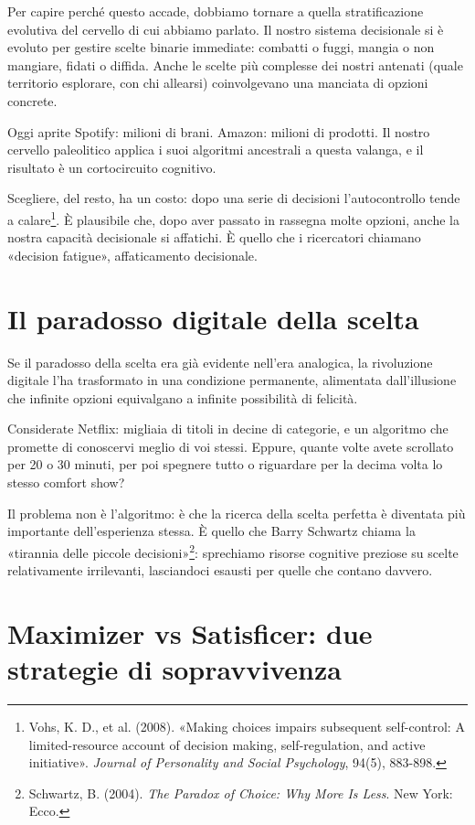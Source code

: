 Per capire perché questo accade, dobbiamo tornare a quella stratificazione evolutiva del cervello di cui abbiamo parlato. Il nostro sistema decisionale si è evoluto per gestire scelte binarie immediate: combatti o fuggi, mangia o non mangiare, fidati o diffida. Anche le scelte più complesse dei nostri antenati (quale territorio esplorare, con chi allearsi) coinvolgevano una manciata di opzioni concrete.

Oggi aprite Spotify: milioni di brani. Amazon: milioni di prodotti. Il nostro cervello paleolitico applica i suoi algoritmi ancestrali a questa valanga, e il risultato è un cortocircuito cognitivo.

Scegliere, del resto, ha un costo: dopo una serie di decisioni l'autocontrollo tende a calare\footnote{Vohs, K. D., et al. (2008). «Making choices impairs subsequent self-control: A limited-resource account of decision making, self-regulation, and active initiative». \textit{Journal of Personality and Social Psychology}, 94(5), 883-898.}. È plausibile che, dopo aver passato in rassegna molte opzioni, anche la nostra capacità decisionale si affatichi. È quello che i ricercatori chiamano «decision fatigue», affaticamento decisionale.

\section{Il paradosso digitale della scelta}

Se il paradosso della scelta era già evidente nell'era analogica, la rivoluzione digitale l'ha trasformato in una condizione permanente, alimentata dall'illusione che infinite opzioni equivalgano a infinite possibilità di felicità.

Considerate Netflix: migliaia di titoli in decine di categorie, e un algoritmo che promette di conoscervi meglio di voi stessi. Eppure, quante volte avete scrollato per 20 o 30 minuti, per poi spegnere tutto o riguardare per la decima volta lo stesso comfort show?

Il problema non è l'algoritmo: è che la ricerca della scelta perfetta è diventata più importante dell'esperienza stessa. È quello che Barry Schwartz chiama la «tirannia delle piccole decisioni»\footnote{Schwartz, B. (2004). \textit{The Paradox of Choice: Why More Is Less}. New York: Ecco.}: sprechiamo risorse cognitive preziose su scelte relativamente irrilevanti, lasciandoci esausti per quelle che contano davvero.

\section{Maximizer vs Satisficer: due strategie di sopravvivenza}

